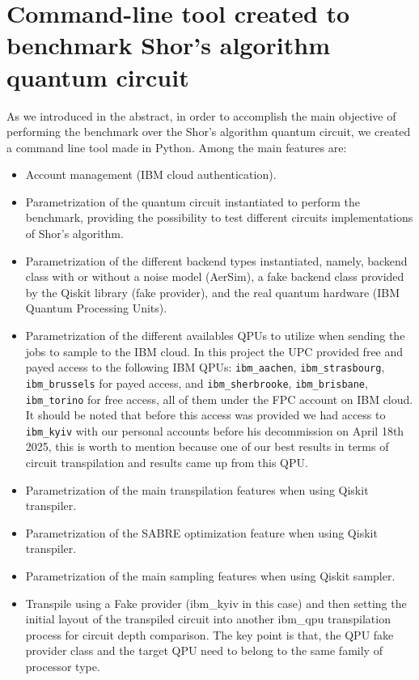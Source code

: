 \documentclass[conference,twoside]{IEEEtran}
\begin{document}
\section{Command-line tool created to benchmark Shor's algorithm quantum circuit}
\label{sec:clt}
As we introduced in the abstract, in order to accomplish the main objective of performing the benchmark over the Shor's algorithm quantum circuit, we created a command line tool made in Python\citep*{commandLineTool}. Among the main features are:
\begin{itemize}
    \item Account management (IBM cloud authentication).
    \item Parametrization of the quantum circuit instantiated to perform the benchmark, providing the possibility to test different circuits implementations of Shor's algorithm.
    \item Parametrization of the different backend types instantiated, namely, backend class with or without a noise model (AerSim), a fake backend class provided by the Qiskit library (fake provider), and the real quantum hardware (IBM Quantum Processing Units).
    \item Parametrization of the different availables QPUs to utilize when sending the jobs to sample to the IBM cloud. In this project the UPC provided free and payed access to the following IBM QPUs: \texttt{ibm\_aachen}, \texttt{ibm\_strasbourg}, \texttt{ibm\_brussels} for payed access, and \texttt{ibm\_sherbrooke}, \texttt{ibm\_brisbane}, \texttt{ibm\_torino} for free access, all of them under the FPC account on IBM cloud. It should be noted that before this access was provided we had access to \texttt{ibm\_kyiv} with our personal accounts before his decommission on April 18th 2025, this is worth to mention because one of our best results in terms of circuit transpilation and results came up from this QPU.
    \item Parametrization of the main transpilation features when using Qiskit transpiler. 
    \item Parametrization of the SABRE optimization feature when using Qiskit transpiler.
    \item Parametrization of the main sampling features when using Qiskit sampler.
    \item Transpile using a Fake provider (ibm\_kyiv in this case) and then setting the initial layout of the transpiled circuit into another ibm\_qpu transpilation process for circuit depth comparison. The key point is that, the QPU fake provider class and the target QPU need to belong to the same family of processor type.

\end{itemize}
\end{document}
